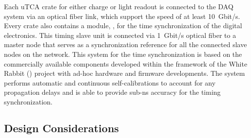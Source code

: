 Each uTCA crate for either charge or light readout is connected to the DAQ system via an optical fiber link, which support the speed of at least \SI{10}{Gbit/s}. Every crate also contains a module, , for the time synchronization of the digital electronics. This timing slave unit is connected via \SI{1}{Gbit/s} optical fiber to a master node that serves as a synchronization reference for all the connected slave nodes on the network. This system for the time synchronization is based on the commercially available components developed within the framework of the White Rabbit () project with ad-hoc hardware and firmware developments. The system performs automatic and continuous self-calibrations to account for any propagation delays and is able to provide sub-ns accuracy for the timing synchronization.


\subsection{Design Considerations}
\label{sec:fddp-tpc-elec-des-consid}


